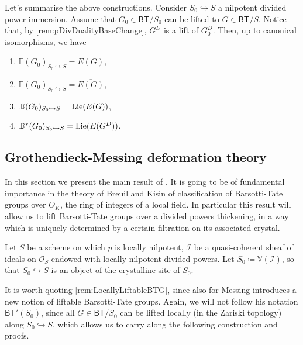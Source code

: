 \begin{rem}[]
	Let's summarise the above constructions.
	Consider $S_0 \hookrightarrow S$ a nilpotent divided power immersion.
	Assume that $G_0 \in \mathsf{BT}/S_0$ can be lifted to $G \in \mathsf{BT}/S$.
	Notice that, by \cref{rem:pDivDualityBaseChange}, $G^D$ is a lift of $G_0^D$.
	Then, up to canonical isomorphisms, we have
\begin{enumerate}
	\item $\mathbb{E}(G_0)_{S_0 \hookrightarrow S} = E(G)$,
	\item $\overline{\mathbb{E}}(G_0)_{S_0 \hookrightarrow S} = \overline{E(G)}$,
	\item $\mathbb{D}(G_0)_{S_0 \hookrightarrow S} = 
		\operatorname{Lie}(E(G))$,
	\item $\mathbb{D}^*(G_0)_{S_0 \hookrightarrow S} = \operatorname{Lie}(E(G^D))$.
\end{enumerate}
\end{rem}



\subsection{Grothendieck-Messing deformation theory}
In this section we present the main result of \cite[Chapter V]{Messing}.
It is going to be of fundamental importance in the theory of Breuil and Kisin of
classification of Barsotti-Tate groups over $O_K$, the ring of integers
of a local field.
In particular this result will allow us to lift Barsotti-Tate groups 
over a divided powers thickening, in a way which is uniquely determined by
a certain filtration on its associated crystal.


\begin{ntt}
	Let $S$ be a scheme on which $p$ is locally nilpotent, $\mathcal{I}$
	be a quasi-coherent sheaf of ideals on $\mathcal{O}_{ S }$ endowed
	with locally nilpotent divided powers.
	Let $S_0 \coloneqq \mathbb{V}(\mathcal{I})$,
	so that $S_0 \hookrightarrow S$ is an object of the crystalline site of $S_0$.
\end{ntt} 


\begin{rem}[]
	It is worth quoting \cref{rem:LocallyLiftableBTG},
	since also for \cite[Chapter V]{Messing} Messing
	introduces a new notion of liftable Barsotti-Tate groups.
	Again, we will not follow his notation $\mathsf{BT}'(S_0)$,
	since all $G \in \mathsf{BT}/S_0$ can be lifted locally
	(in the Zariski topology) along $S_0 \hookrightarrow S$,
	which allows us to carry along the following construction
	and proofs.
\end{rem}


